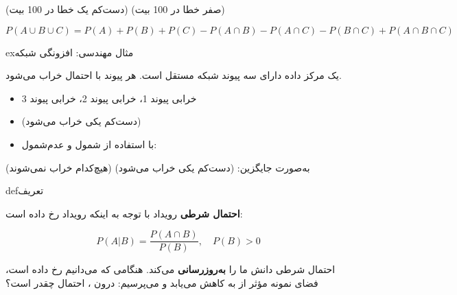 \begin{PSquote}

(دست‌کم یک خطا در 100 بیت) (صفر خطا در 100 بیت)

\end{PSquote}


\[P(A \cup B \cup C) = P(A) + P(B) + P(C) - P(A \cap B) - P(A \cap C) - P(B \cap C) + P(A \cap B \cap C)\]

\begin{PSbox}[unbreakable]{ex}{مثال مهندسی: افزونگی شبکه}

یک مرکز داده دارای سه پیوند شبکه مستقل است. هر پیوند با احتمال  خراب می‌شود.

\begin{itemize}
\tightlist
\item
   خرابی پیوند 1،  خرابی پیوند 2،  خرابی پیوند 3
\item
  (دست‌کم یکی خراب می‌شود) 
\item
  با استفاده از شمول و عدم‌شمول:
\end{itemize}


به‌صورت جایگزین: (دست‌کم یکی خراب می‌شود) (هیچ‌کدام خراب نمی‌شوند) 

\end{PSbox}


\begin{PSbox}[unbreakable]{def}{تعریف}

\textbf{احتمال شرطی} رویداد  با توجه به اینکه رویداد  رخ داده است:

\[P(A|B) = \frac{P(A \cap B)}{P(B)}, \quad P(B) > 0\]

\end{PSbox}


احتمال شرطی دانش ما را \textbf{به‌روزرسانی} می‌کند. هنگامی که می‌دانیم  رخ داده است، فضای نمونه مؤثر از  به  کاهش می‌یابد و می‌پرسیم: درون ، احتمال  چقدر است؟


